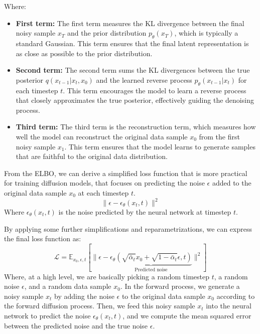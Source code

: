 Where:
\begin{itemize}
    \item \textbf{First term:} The first term measures the KL divergence between the final noisy sample \(x_T\) and the prior distribution \(p_\theta(x_T)\), which is typically a standard Gaussian. 
    This term ensures that the final latent representation is as close as possible to the prior distribution.
    
    \item \textbf{Second term:} The second term sums the KL divergences between the true posterior \(q(x_{t-1} | x_t, x_0)\) and the learned reverse process \(p_\theta(x_{t-1} | x_t)\) for each timestep \(t\).
    This term encourages the model to learn a reverse process that closely approximates the true posterior, effectively guiding the denoising process.

    \item \textbf{Third term:} The third term is the reconstruction term, which measures how well the model can reconstruct the original data sample \(x_0\) from the first noisy sample \(x_1\).
    This term ensures that the model learns to generate samples that are faithful to the original data distribution.
\end{itemize}

From the ELBO, we can derive a simplified loss function that is more practical for training diffusion models,
that focuses on predicting the noise \(\epsilon\) added to the original data sample \(x_0\) at each timestep \(t\).
\begin{equation}
    \| \epsilon - \epsilon_\theta(x_t, t) \|^2
\end{equation}
Where \(\epsilon_\theta(x_t, t)\) is the noise predicted by the neural network at timestep \(t\).

By applying some further simplifications and reparametrizations, we can express the final loss function as:
\[
    \mathcal{L} = \mathbb{E}_{x_0, \epsilon, t} \left[ \| \epsilon - \underbrace{\epsilon_\theta(\sqrt{\bar{\alpha}_t} x_0 + \sqrt{1 - \bar{\alpha}_t} \epsilon, t)}_{\text{Predicted noise}} \|^2 \right]
\]
Where, at a high level, we are basically picking a random timestep \(t\), a random noise \(\epsilon\), and a random data sample \(x_0\). 
In the forward process, we generate a noisy sample \(x_t\) by adding the noise \(\epsilon\) to the original data sample \(x_0\) according to the forward diffusion process. 
Then, we feed this noisy sample \(x_t\) into the neural network to predict the noise \(\epsilon_\theta(x_t, t)\), and we compute the mean squared error between the predicted noise and the true noise \(\epsilon\).

